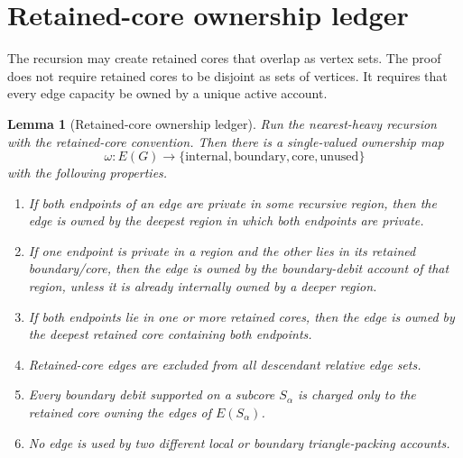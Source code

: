 \documentclass[11pt]{article}
\newtheorem{lemma}[theorem]{Lemma}
\theoremstyle{definition}
\begin{document}
\section{Retained-core ownership ledger}\label{sec:ownership-ledger}

The recursion may create retained cores that overlap as vertex sets. The proof does not require retained cores to be disjoint as sets of vertices. It requires that every edge capacity be owned by a unique active account.

\begin{lemma}[Retained-core ownership ledger]\label{lem:retained-core-ledger}
Run the nearest-heavy recursion with the retained-core convention. Then there is a single-valued ownership map
\[
    \omega:E(G)\to
    \{\mathrm{internal},\mathrm{boundary},\mathrm{core},\mathrm{unused}\}
\]
with the following properties.
\begin{enumerate}[label=(\roman*)]
    \item If both endpoints of an edge are private in some recursive region, then the edge is owned by the deepest region in which both endpoints are private.
    \item If one endpoint is private in a region and the other lies in its retained boundary/core, then the edge is owned by the boundary-debit account of that region, unless it is already internally owned by a deeper region.
    \item If both endpoints lie in one or more retained cores, then the edge is owned by the deepest retained core containing both endpoints.
    \item Retained-core edges are excluded from all descendant relative edge sets.
    \item Every boundary debit supported on a subcore \(S_\alpha\) is charged only to the retained core owning the edges of \(E(S_\alpha)\).
    \item No edge is used by two different local or boundary triangle-packing accounts.
\end{enumerate}
\end{lemma}
\end{document}
